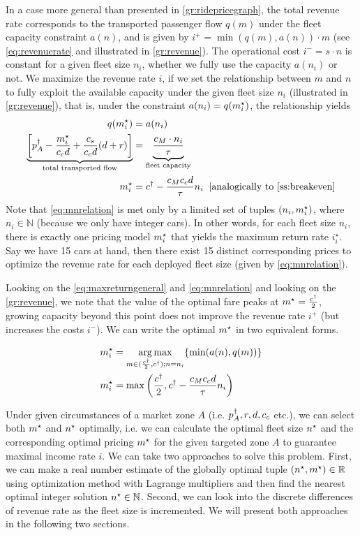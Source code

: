 \documentclass[a4paper]{report}
\DeclareMathOperator*{\argmax}{arg\,max}
\begin{document}
\newcommand\msn[1]{$m_{#1}^{\star}$}
In a case more general than presented in \autoref{gr:ridepricegraph}, the total revenue rate corresponds to the transported passenger flow $q(m)$ under the fleet capacity constraint $a(n)$, and is given by $i^+=\min(q(m),a(n))\cdot m$ (see \autoref{eq:revenuerate} and illustrated in \autoref{gr:revenue}). The operational cost $i^-=s\cdot n$ is constant for a given fleet size $n_i$, whether we fully use the capacity $a(n_i)$ or not. We maximize the revenue rate $i$, if we set the relationship between $m$ and $n$ to fully exploit the available capacity under the given fleet size $n_i$ (illustrated in \autoref{gr:revenue}), that is, under the constraint $a(n_i)=q(m^{\star}_i)$, the relationship yields
\begin{align}
	q(\ms_i)&= a(n_i)\nonumber\\
	\underbrace{\left[\pd - \frac{\ms_i}{c_cd}+\frac{c_s}{c_cd}(d+r)\right]}_{\text{total transported flow}}&=\underbrace{\frac{c_M\cdot n_i}{\tau}}_{\text{fleet capacity}} \nonumber\\
	 \ms_i&=\cd - \frac{c_Mc_cd}{\tau} n_i\label{eq:mnrelation}\;\;|\text{analogically to \autoref{ss:breakeven}}
\end{align}
Note that \autoref{eq:mnrelation} is met only by a limited set of tuples $(n_i,m^{\star}_{i})$, where $n_i\in\mathbb{N}$ (because we only have integer cars). In other words, for each fleet size $n_i$, there is exactly one pricing model $m^{\star}_i$ that yields the maximum return rate $i^\star_i$. Say we have 15 cars at hand, then there exist 15 distinct corresponding prices to optimize the revenue rate for each deployed fleet size (given by \autoref{eq:mnrelation}).%

Looking on the \autoref{eq:maxreturngeneral} and \autoref{eq:mnrelation} and looking on the \autoref{gr:revenue}, we note that the value of the optimal fare peaks at $m^{\star}=\frac{c^{\dagger}}{2}$, growing capacity beyond this point does not improve the revenue rate $i^+$ (but increases the costs $i^-$). We can write the optimal $m^{\star}$ in two equivalent forms.%

\begin{align}
	\ms_i&=\argmax\limits_{m\in(\frac{\cd}{2},\cd); n=n_i} \{\min(a(n),q(m))\} \nonumber\\
	\ms_i&=\max\left(\frac{\cd}{2},\cd-\frac{c_Mc_cd}{\tau}n_i\right) \label{eq:mscomplete}
\end{align}

Under given circumstances of a market zone $A$ (i.e. $p_A^{\dagger}, r, d, c_c$ etc.), we can select both $m^{\star}$ and $n^\star$ optimally, i.e. we can calculate the optimal fleet size $n^\star$ and the corresponding optimal pricing $m^{\star}$ for the given targeted zone $A$ to guarantee maximal income rate $i$. We can take two approaches to solve this problem. First, we can make a real number estimate of the globally optimal tuple $(n^\star,m^{\star})\in \mathbb{R}$ using optimization method with Lagrange multipliers and then find the nearest optimal integer solution $n^\star\in\mathbb{N}$. Second, we can look into the discrete differences of revenue rate as the fleet size is incremented. We will present both approaches in the following two sections.%
\end{document}
